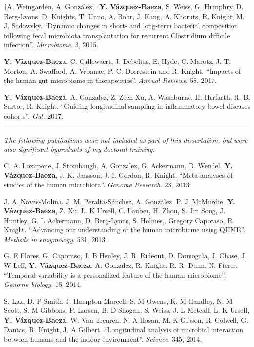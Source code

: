\begin{frontmatter}
\begin{vitapage}
\begin{publications}
    \item $\dagger$A. Weingarden, A. Gonz\'alez, \textbf{$\dagger$Y. V\'azquez-Baeza}, S. Weiss, G. Humphry, D. Berg-Lyons, D. Knights, T. Unno, A. Bobr, J. Kang, A. Khoruts, R. Knight, M. J. Sadowsky. ``Dynamic changes in short- and long-term bacterial composition following fecal microbiota transplantation for recurrent Clostridium difficile infection''. \emph{Microbiome}. 3, 2015.

    \item \textbf{Y. V\'azquez-Baeza}, C. Callewaert, J. Debelius, E. Hyde, C. Marotz, J. T. Morton, A. Swafford, A. Vrbanac, P. C. Dorrestein and R. Knight. ``Impacts of the human gut microbiome in therapeutics''. \emph{Annual Reviews}. 58, 2017.

    \item \textbf{Y. V\'azquez-Baeza}, A. Gonzalez, Z. Zech Xu, A. Washburne, 
        H. Herfarth, R. B. Sartor, R. Knight. ``Guiding longitudinal sampling 
        in inflammatory bowel diseases cohorts''. \emph{Gut}. 2017.

    \item \noindent\rule[0.5ex]{\linewidth}{0.5pt}

    \textsl{The following publications were not included as part of this dissertation, but were also significant byproducts of my doctoral training.}

    \item C. A. Lozupone, J. Stombaugh, A. Gonzalez, G. Ackermann, D. Wendel, \textbf{Y. V\'azquez-Baeza}, J. K. Jansson, J. I. Gordon, R. Knight. ``Meta-analyses of studies of the human microbiota''. \emph{Genome Research}. 23, 2013.

    \item J. A. Navas-Molina, J. M. Peralta-S\'anchez, A. Gonz\'alez, P. J. McMurdie, \textbf{Y. V\'azquez-Baeza}, Z. Xu, L. K Ursell, C. Lauber, H. Zhou, S. Jin Song, J. Huntley, G. L Ackermann, D. Berg-Lyons, S. Holmes,. Gregory Caporaso, R. Knight. ``Advancing our understanding of the human microbiome using QIIME''. \emph{Methods in enzymology}. 531, 2013.

    \item G. E Flores, G. Caporaso, J. B Henley, J. R. Rideout, D. Domogala, J. Chase, J. W Leff, \textbf{Y. V\'azquez-Baeza}, A. Gonzalez, R. Knight, R. R. Dunn, N. Fierer. ``Temporal variability is a personalized feature of the human microbiome''. \emph{Genome biology}. 15, 2014.

    \item S. Lax, D. P Smith, J. Hampton-Marcell, S. M Owens, K. M Handley, N. M Scott, S. M Gibbons, P. Larsen, B. D Shogan, S. Weiss, J. L Metcalf, L. K Ursell, \textbf{Y. V\'azquez-Baeza}, W. Van Treuren, N. A Hasan, M. K Gibson, R. Colwell, G. Dantas, R. Knight, J. A Gilbert. ``Longitudinal analysis of microbial interaction between humans and the indoor environment''. \emph{Science}. 345, 2014.


\end{publications}
\end{vitapage}
\end{frontmatter}
